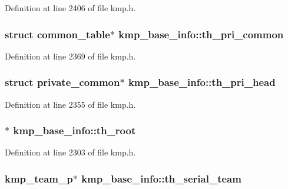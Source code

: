 Definition at line 2406 of file kmp.\-h.

\hypertarget{structkmp__base__info_aa2ed8a418357603a07a7d12b2d0750c3}{
\subsubsection[{th\-\_\-pri\-\_\-common}]{\setlength{\rightskip}{0pt plus 5cm}struct {\bf common\-\_\-table}$\ast$ kmp\-\_\-base\-\_\-info\-::th\-\_\-pri\-\_\-common}}\label{structkmp__base__info_aa2ed8a418357603a07a7d12b2d0750c3}


Definition at line 2369 of file kmp.\-h.

\hypertarget{structkmp__base__info_a62a3010124c7c058c41b155a079e41bf}{
\subsubsection[{th\-\_\-pri\-\_\-head}]{\setlength{\rightskip}{0pt plus 5cm}struct {\bf private\-\_\-common}$\ast$ kmp\-\_\-base\-\_\-info\-::th\-\_\-pri\-\_\-head}}\label{structkmp__base__info_a62a3010124c7c058c41b155a079e41bf}


Definition at line 2355 of file kmp.\-h.

\hypertarget{structkmp__base__info_ab24ae3c86062b1007b6403d0673f0401}{
\subsubsection[{th\-\_\-root}]{$\ast$ kmp\-\_\-base\-\_\-info\-::th\-\_\-root}}\label{structkmp__base__info_ab24ae3c86062b1007b6403d0673f0401}


Definition at line 2303 of file kmp.\-h.

\hypertarget{structkmp__base__info_a2511f7e8e7a8c505c3f27745e7cf7d3f}{
\subsubsection[{th\-\_\-serial\-\_\-team}]{ {\bf kmp\-\_\-team\-\_\-p}$\ast$ kmp\-\_\-base\-\_\-info\-::th\-\_\-serial\-\_\-team}}\label{structkmp__base__info_a2511f7e8e7a8c505c3f27745e7cf7d3f}


